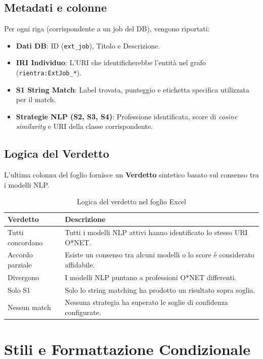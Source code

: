 \documentclass[12pt, a4paper]{report}
\begin{document}
\subsection{Metadati e colonne}

Per ogni riga (corrispondente a un job del DB), vengono riportati:
\begin{itemize}
    \item \textbf{Dati DB}: ID (\texttt{ext\_job}), Titolo e Descrizione.
    \item \textbf{IRI Individuo}: L'URI che identificherebbe l'entità nel grafo (\texttt{rientra:ExtJob\_*}).
    \item \textbf{S1 String Match}: Label trovata, punteggio e etichetta specifica utilizzata per il match.
    \item \textbf{Strategie NLP (S2, S3, S4)}: Professione identificata, score di \textit{cosine similarity} e URI della classe corrispondente.
\end{itemize}

\subsection{Logica del Verdetto}

L'ultima colonna del foglio fornisce un \textbf{Verdetto} sintetico basato sul consenso tra i modelli NLP.

\begin{table}[H]
\centering
\begin{tabular}{lp{9cm}}
\toprule
\textbf{Verdetto} & \textbf{Descrizione} \\
\midrule
Tutti concordano & Tutti i modelli NLP attivi hanno identificato lo stesso URI O*NET. \\
Accordo parziale & Esiste un consenso tra alcuni modelli o lo score è considerato affidabile. \\
Divergono & I modelli NLP puntano a professioni O*NET differenti. \\
Solo S1 & Solo lo string matching ha prodotto un risultato sopra soglia. \\
Nessun match & Nessuna strategia ha superato le soglie di confidenza configurate. \\
\bottomrule
\end{tabular}
\caption{Logica del verdetto nel foglio Excel}
\end{table}

\section{Stili e Formattazione Condizionale}
\end{document}

